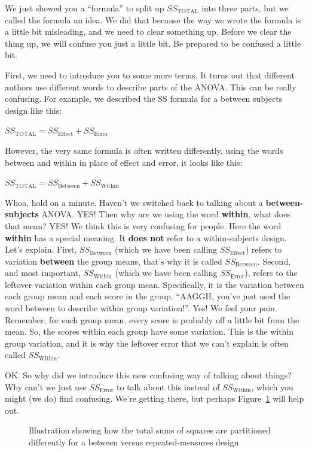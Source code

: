 \documentclass[
  letterpaper,
  DIV=11,
  numbers=noendperiod]{scrreprt}
\begin{document}
We just showed you a ``formula'' to split up \(SS_\text{TOTAL}\) into
three parts, but we called the formula an idea. We did that because the
way we wrote the formula is a little bit misleading, and we need to
clear something up. Before we clear the thing up, we will confuse you
just a little bit. Be prepared to be confused a little bit.

First, we need to introduce you to some more terms. It turns out that
different authors use different words to describe parts of the ANOVA.
This can be really confusing. For example, we described the SS formula
for a between subjects design like this:

\(SS_\text{TOTAL} = SS_\text{Effect} + SS_\text{Error}\)

However, the very same formula is often written differently, using the
words between and within in place of effect and error, it looks like
this:

\(SS_\text{TOTAL} = SS_\text{Between} + SS_\text{Within}\)

Whoa, hold on a minute. Haven't we switched back to talking about a
\textbf{between-subjects} ANOVA. YES! Then why are we using the word
\textbf{within}, what does that mean? YES! We think this is very
confusing for people. Here the word \textbf{within} has a special
meaning. It \textbf{does not} refer to a within-subjects design. Let's
explain. First, \(SS_\text{Between}\) (which we have been calling
\(SS_\text{Effect}\)) refers to variation \textbf{between} the group
means, that's why it is called \(SS_\text{Between}\). Second, and most
important, \(SS_\text{Within}\) (which we have been calling
\(SS_\text{Error}\)), refers to the leftover variation within each group
mean. Specifically, it is the variation between each group mean and each
score in the group. ``AAGGH, you've just used the word between to
describe within group variation!''. Yes! We feel your pain. Remember,
for each group mean, every score is probably off a little bit from the
mean. So, the scores within each group have some variation. This is the
within group variation, and it is why the leftover error that we can't
explain is often called \(SS_\text{Within}\).

OK. So why did we introduce this new confusing way of talking about
things? Why can't we just use \(SS_\text{Error}\) to talk about this
instead of \(SS_\text{Within}\), which you might (we do) find confusing.
We're getting there, but perhaps Figure~\ref{fig-9splitSS} will help
out.

\begin{figure}


\caption{\label{fig-9splitSS}Illustration showing how the total sums of
squares are partitioned differently for a between versus
repeated-measures design}

\end{figure}%
\end{document}

